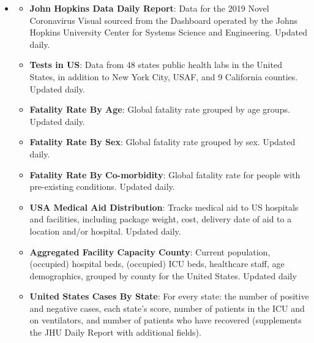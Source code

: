 \documentclass[11pt]{article}
\newcommand{\comment}[1]{{\color{red}{#1}}}
\newcommand{\MYhref}[3][blue]{\href{#2}{\color{#1}{#3}}}%
\begin{document}
\begin{itemize}
    \item \MYhref{https://www.npmjs.com/package/covid19-api}{Covid-19 API}
        \begin{itemize}
        \item \textbf{John Hopkins Data Daily Report}: Data for the 2019 Novel Coronavirus Visual sourced from the Dashboard operated by the Johns Hopkins University Center for Systems Science and Engineering. Updated daily. \comment{}
        \item \textbf{Tests in US}: Data from 48 states public health labs in the United States, in addition to New York City, USAF, and 9 California counties. Updated daily.
        \item \textbf{Fatality Rate By Age}: Global fatality rate grouped by age groups. Updated daily.
        \item \textbf{Fatality Rate By Sex}: Global fatality rate grouped by sex. Updated daily.
        \item \textbf{Fatality Rate By Co-morbidity}: Global fatality rate for people with pre-existing conditions. Updated daily.
        \item \textbf{USA Medical Aid Distribution}: Tracks medical aid to US hospitals and facilities, including package weight, cost, delivery date of aid to a location and/or hospital. Updated daily.
        \item \textbf{Aggregated Facility Capacity County}: Current population, (occupied) hospital beds, (occupied) ICU beds, healthcare staff, age demographics, grouped by county for the United States. Updated daily 
        \item \textbf{United States Cases By State}: For every state: the number of positive and negative cases, each state's score, number of patients in the ICU and on ventilators, and number of patients who have recovered (supplements the JHU Daily Report with additional fields).
    \end{itemize} 
\end{itemize}
\end{document}
